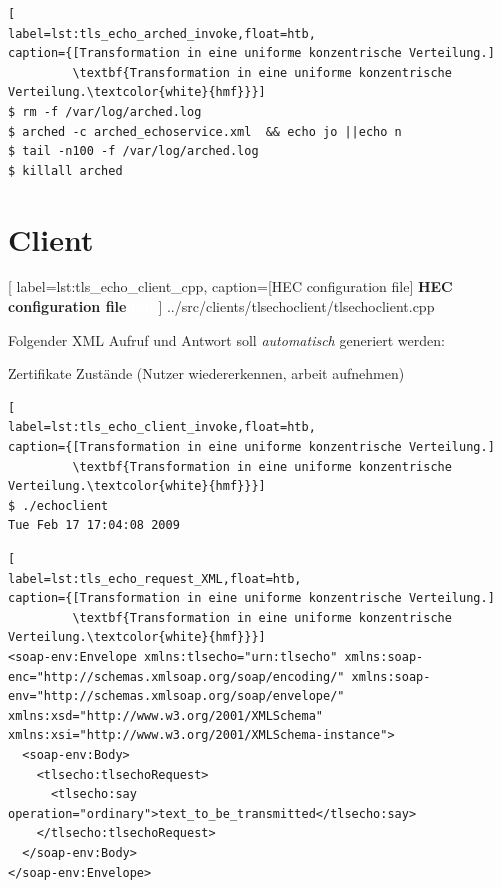 \begin{lstlisting}[
label=lst:tls_echo_arched_invoke,float=htb,
caption={[Transformation in eine uniforme konzentrische Verteilung.]
         \textbf{Transformation in eine uniforme konzentrische Verteilung.\textcolor{white}{hmf}}}]
$ rm -f /var/log/arched.log
$ arched -c arched_echoservice.xml  && echo jo ||echo n
$ tail -n100 -f /var/log/arched.log
$ killall arched
\end{lstlisting}




\clearpage
\section{Client}


	[
	label=lst:tls_echo_client_cpp,
	caption={[HEC configuration file]
	\textbf{HEC configuration file\textcolor{white}{hmf}}}
	]
{../src/clients/tlsechoclient/tlsechoclient.cpp}



Folgender XML Aufruf und Antwort soll \textit{automatisch} generiert werden:






Zertifikate
Zustände (Nutzer wiedererkennen, arbeit aufnehmen)




\begin{lstlisting}[
label=lst:tls_echo_client_invoke,float=htb,
caption={[Transformation in eine uniforme konzentrische Verteilung.]
         \textbf{Transformation in eine uniforme konzentrische Verteilung.\textcolor{white}{hmf}}}]
$ ./echoclient
Tue Feb 17 17:04:08 2009
\end{lstlisting}






\begin{lstlisting}[
label=lst:tls_echo_request_XML,float=htb,
caption={[Transformation in eine uniforme konzentrische Verteilung.]
         \textbf{Transformation in eine uniforme konzentrische Verteilung.\textcolor{white}{hmf}}}]
<soap-env:Envelope xmlns:tlsecho="urn:tlsecho" xmlns:soap-enc="http://schemas.xmlsoap.org/soap/encoding/" xmlns:soap-env="http://schemas.xmlsoap.org/soap/envelope/" xmlns:xsd="http://www.w3.org/2001/XMLSchema" xmlns:xsi="http://www.w3.org/2001/XMLSchema-instance">
  <soap-env:Body>
    <tlsecho:tlsechoRequest>
      <tlsecho:say operation="ordinary">text_to_be_transmitted</tlsecho:say>
    </tlsecho:tlsechoRequest>
  </soap-env:Body>
</soap-env:Envelope>
\end{lstlisting}






